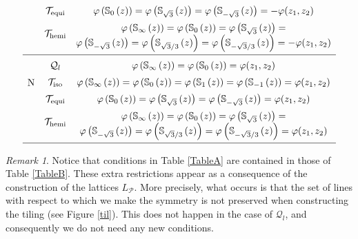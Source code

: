 \documentclass{amsart}
\theoremstyle{definition}
\theoremstyle{remark}
\newtheorem{remark}[theorem]{Remark}
\newcommand{\vp}{\varphi}
\numberwithin{equation}{section}
\theoremstyle{definition}
\theoremstyle{remark}
\begin{document}
\begin{center}
\begin{equation}
\begin{array}{ccc}
		&\rule{0pt}{3.2ex} \mathcal{T}_{\mathrm{equi}} & \vp\left(\mathbb{S}_0\left(z\right)\right)=\vp\left(\mathbb{S}_{\sqrt{3}}\left(z\right)\right)=\vp\left(\mathbb{S}_{-\sqrt{3}}\left(z\right)\right)=-\vp(z_1,z_2) \\
		&\rule{0pt}{3.2ex} \multirow{2}{*}{$\mathcal{T}_{\mathrm{hemi}}$} & \vp\left(\mathbb{S}_\infty\left(z\right)\right)=\vp\left(\mathbb{S}_0\left(z\right)\right)=\vp\left(\mathbb{S}_{\sqrt{3}}\left(z\right)\right)=\\&&\vp\left(\mathbb{S}_{-\sqrt{3}}\left(z\right)\right)=\vp\left(\mathbb{S}_{\sqrt{3}/3}\left(z\right)\right)=\vp\left(\mathbb{S}_{-\sqrt{3}/3}\left(z\right)\right)=-\vp(z_1,z_2)	\vspace{0.1cm} \\
		\hline
		\multirow{4}{*}{$\mathrm{N}$} &\rule{0pt}{3.2ex} \mathcal{Q}_l & \vp\left(\mathbb{S}_\infty\left(z\right)\right)=\vp\left(\mathbb{S}_0\left(z\right)\right)=\vp(z_1,z_2) \\
		& \rule{0pt}{3.2ex}\mathcal{T}_{\mathrm{iso}} & \vp\left(\mathbb{S}_\infty\left(z\right)\right)=\vp\left(\mathbb{S}_0\left(z\right)\right)=\vp\left(\mathbb{S}_1\left(z\right)\right)=\vp\left(\mathbb{S}_{-1}\left(z\right)\right)=\vp(z_1,z_2)   \\
		& \rule{0pt}{3.2ex}\mathcal{T}_{\mathrm{equi}}& \vp\left(\mathbb{S}_0\left(z\right)\right)=\vp\left(\mathbb{S}_{\sqrt{3}}\left(z\right)\right)=\vp\left(\mathbb{S}_{-\sqrt{3}}\left(z\right)\right)=\vp(z_1,z_2) \\
		&\rule{0pt}{3.2ex} \multirow{2}{*}{$\mathcal{T}_{\mathrm{hemi}}$} & \vp\left(\mathbb{S}_\infty\left(z\right)\right)=\vp\left(\mathbb{S}_0\left(z\right)\right)=\vp\left(\mathbb{S}_{\sqrt{3}}\left(z\right)\right)=\\&&\vp\left(\mathbb{S}_{-\sqrt{3}}\left(z\right)\right)=\vp\left(\mathbb{S}_{\sqrt{3}/3}\left(z\right)\right)=\vp\left(\mathbb{S}_{-\sqrt{3}/3}\left(z\right)\right)=\vp(z_1,z_2)	\vspace{0.1cm} \\
		\hline
	\end{array} \end{equation}
\end{center}\begin{remark}
Notice that conditions in Table \ref{TableA} are contained in those of Table \ref{TableB}. These extra restrictions appear as a consequence of the construction of the lattices $L_{\mathcal{P}}$. More precisely, what occurs is that the set of lines with respect to which we make the symmetry is not preserved when constructing the tiling (see Figure \ref{til}). This does not happen in the case of $\mathcal{Q}_l$, and consequently we do not need any new conditions.
\end{remark}
\end{document}
